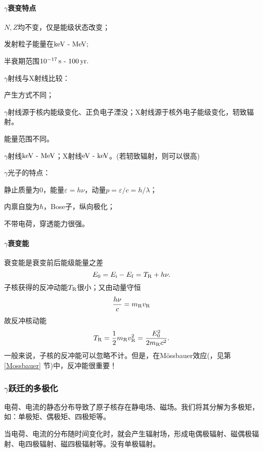 \paragraph{$\gamma$衰变特点}
\begin{compactenum}
	\item $N,Z$均不变，仅是能级状态改变；
	\item 发射粒子能量在$\si{keV}\vs\si{MeV};$
	\item 半衰期范围$\SI{e-17}{s}\vs\SI{100}{yr}.$
\end{compactenum}
$\gamma$射线与X射线比较：
\begin{compactenum}
	\item 产生方式不同；
	
	$\gamma$射线源于核内能级变化、正负电子湮没；X射线源于核外电子能级变化，轫致辐射。
	\item 能量范围不同。
	
	$\gamma$射线$\si{keV}\vs\si{MeV}$；X射线$\si{eV}\vs\si{keV}$。(若轫致辐射，则可以很高)
\end{compactenum}
$\gamma$光子的特点：
\begin{compactenum}
	\item 静止质量为0，能量$\varepsilon=h\nu$，动量$p=\varepsilon/c=h/\lambda$；
	\item 内禀自旋为$\hbar$，Bose子，纵向极化；
	\item 不带电荷，穿透能力很强。
\end{compactenum}
\paragraph{$\gamma$衰变能}
衰变能是衰变前后能级能量之差
\[
	E_0=E_\ini-E_\fin=T_{\nuc R}+h\nu.
\]
子核获得的反冲动能$T_{\nuc R}$很小；又由动量守恒
\[
	\frac{h\nu}c=m_{\nuc R}v_{\nuc R}
\]
故反冲核动能
\begin{align}
	T_{\nuc R}=\frac12m_{\nuc R}v_{\nuc R}^2=\frac{E_0^2}{2m_{\nuc R}c^2}.
\end{align}
一般来说，子核的反冲能可以忽略不计。但是，在Mössbauer效应(，见第 \ref{Mossbauer} 节)中，反冲能很重要！
\subsubsection[\textit{\textgamma}跃迁的多极化]{$\gamma$跃迁的多极化}
电荷、电流的静态分布导致了原子核存在静电场、磁场。我们将其分解为多极矩，如：单极矩、偶极矩、四极矩等。

当电荷、电流的分布随时间变化时，就会产生辐射场，形成电偶极辐射、磁偶极辐射、电四极辐射、磁四极辐射等。没有单极辐射。

